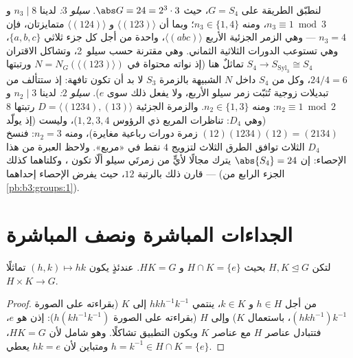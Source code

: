 \begin{example}
\label{ex:b3:groups:s4sylow}
لنطبّق الطريقة على $G = S_4$، حيث $\abs G = 24 = 2^3\cdot3$.
\emph{سيلو $3$:} لدينا $n_3 \mid 8$ و $n_3 \equiv 1 \bmod 3$، ومنه $n_3
\in \{1, 4\}$؛
وبما أن $\langle(123)\rangle$ و $\langle(124)\rangle$ متمايزتان، فإن $n_3 = 4$ --- وهي
الزمر الجزئية الأربع $\langle(abc)\rangle$، واحدة من أجل كل جزء ثلاثي
$\{a, b, c\}$، وهي تستوعب الدورات الثلاثية الثماني. وهي مقترنة
حسب سيلو~2، وتشاكل الاقتران $S_4 \to
S_{\mathrm{Syl}_3} \cong S_4$ تماثلٌ هنا (إذ نواته محتواة
في $N = N_G(\langle(123)\rangle)$ ورتبتها $24/4 =
6$، وكل  من $S_4$
داخل $N$ الشبيهة بالزمرة $S_3$ لا بد أن تكون تافهة: إذ ستتألف من
تبديلات زوجية تُثبّت زمر سيلو الأربع، ولا يفعل ذلك سوى $e$).
\emph{سيلو $2$:} لدينا $n_2 \mid 3$ و $n_2
\equiv 1 \bmod 2$: ومنه $n_2 \in \{1, 3\}$.
والزمرة الجزئية $D =
\langle(1234), (13)\rangle$ رتبتها $8$ (وهي 
$D_4$: تناظرات المربع ذي الرؤوس $1, 2, 3, 4$)، وليست 
(إذ يولّد $(12)(1234)(12) = (2134)$ زمرة دورات رباعية مغايرة)، ومنه $n_2 = 3$:
فنسخ $D_4$ الثلاث توافق الطرق الثلاث لتزويج $4$ نقط في «مربع».
ولاحظ العبرة من هذا الإحصاء: إن $\abs{S_4} = 24$ يترك مجالًا
لأيٍّ من زمرتَي سيلو ألّا تكون ، وكلتاهما كذلك  ---
قارن ذلك بالرتبة $12$، حيث يفرض الإحصاء  إحداهما (الجزء
الرابع من \cref{pb:b3:groups:1}).
\end{example}

\section{الجداءات المباشرة ونصف المباشرة}

\begin{proposition}\label{prop:b3:groups:direct}
لتكن $H, K \trianglelefteq G$ بحيث $H \cap K = \{e\}$ و $HK = G$. عندئذٍ يكون $(h,k) \mapsto hk$
تماثلًا $H \times K \to
G$.
\end{proposition}

\begin{proof}
من أجل $h \in H$ و $k \in K$، ينتمي  $hkh^{-1}k^{-1}$ إلى
$K$ (بقراءته على الصورة $(hkh^{-1})k^{-1}$، باستعمال  $K$) وإلى $H$
(بقراءته على الصورة $h(kh^{-1}k^{-1})$): إذن هو $e$، فتتبادل عناصر $H$ مع
عناصر $K$ ويكون التطبيق تشاكلًا. وهو شامل لأن $HK = G$، ومتباين
لأن $hk = e$ يعطي $h = k^{-1} \in
H \cap K = \{e\}$.
\end{proof}

